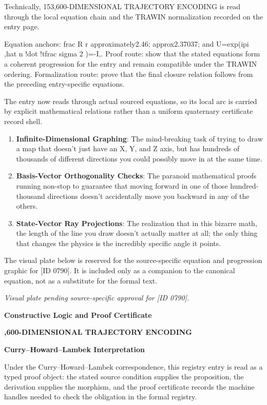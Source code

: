 Technically, 153,600-DIMENSIONAL TRAJECTORY ENCODING is read through the local equation chain and the TRAWIN normalization recorded on the entry page.

Equation anchors: frac R r approximately2.46; approx2.37037; and U=exp(ipi ,hat n !dot !tfrac sigma 2 )=-I,. Proof route: show that the stated equations form a coherent progression for the entry and remain compatible under the TRAWIN ordering. Formalization route: prove that the final closure relation follows from the preceding entry-specific equations.

The entry now reads through actual sourced equations, so its local arc is carried by explicit mathematical relations rather than a uniform quaternary certificate record shell.
\endgroup

\begin{enumerate}[leftmargin=1.6em,itemsep=6pt,topsep=4pt]
\item \textbf{Infinite-Dimensional Graphing}: The mind-breaking task of trying to draw a map that doesn't just have an X, Y, and Z axis, but has hundreds of thousands of different directions you could possibly move in at the same time.
\item \textbf{Basis-Vector Orthogonality Checks}: The paranoid mathematical proofs running non-stop to guarantee that moving forward in one of those hundred-thousand directions doesn't accidentally move you backward in any of the others.
\item \textbf{State-Vector Ray Projections}: The realization that in this bizarre math, the length of the line you draw doesn't actually matter at all; the only thing that changes the physics is the incredibly specific angle it points.
\end{enumerate}

\begingroup\footnotesize\sloppy
The visual plate below is reserved for the source-specific equation and progression graphic for [ID 0790]. It is included only as a companion to the canonical equation, not as a substitute for the formal text.
\par\endgroup
\begingroup\footnotesize\itshape
Visual plate pending source-specific approval for [ID 0790].
\par\endgroup

\clearpage
\begingroup\tzpsupportsetup
\noindent\textbf{\fontsize{10.8pt}{12.8pt}\selectfont [ID 0790] Constructive Logic and Proof Certificate}\par
\noindent\textbf{\fontsize{10pt}{12pt},600-DIMENSIONAL TRAJECTORY ENCODING}\par
\vspace{0.45em}
\begingroup
\footnotesize
\setlength{\parskip}{0.22em}
\setlength{\parindent}{0pt}
\noindent\textbf{Curry--Howard--Lambek Interpretation}\par
Under the Curry--Howard--Lambek correspondence, this registry entry is read as a typed proof
object: the stated source condition supplies the proposition, the derivation supplies the
morphism, and the proof certificate records the machine handles needed to check the obligation
in the formal registry.


